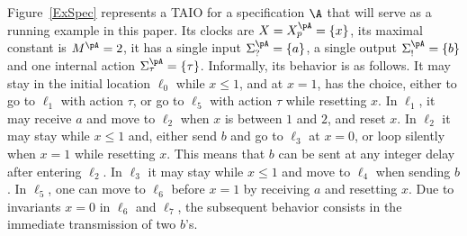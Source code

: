 \documentclass{LMCS}
\theoremstyle{plain}\newtheorem{proposition}[thm]{Proposition}
\begin{document}
\begin{exa}
Figure~\ref{ExSpec} represents a TAIO for a specification $\A$
that will serve as a running example in this paper.
Its clocks are $X=X_p^\pA=\{x\}$, its maximal constant is $M^\pA=2$, 
it has a single input $\Sigma_?^\pA=\{a\}$, 
a single output $\Sigma_!^\pA=\{b\}$ and 
one internal action $\Sigma_\tau^\pA=\{\tau\}$.
Informally, its behavior is as follows.
It may stay in the initial location $\ell_0$ while $x\leq 1$,
and at $x=1$, has the choice, either to go to $\ell_1$ with action $\tau$,
or go to $\ell_5$ with action $\tau$ while resetting $x$.
In $\ell_1$, it may receive $a$ and move to $\ell_2$ 
when $x$ is between $1$ and $2$, and reset $x$.
In $\ell_2$ it may stay while $x\leq 1$ and, 
either send $b$ and go to $\ell_3$ at $x=0$, 
or loop silently when $x=1$  while resetting $x$.
This means that $b$ can be sent at any integer delay after entering
$\ell_2$.
In $\ell_3$ it may stay while $x\leq 1$ and move to $\ell_4$ when sending $b$.
In $\ell_5$, one can move to $\ell_6$ before $x=1$ by receiving $a$ 
and resetting  $x$. Due to invariants $x=0$ in $\ell_6$ and 
$\ell_7$, the subsequent behavior consists in the immediate 
transmission of two $b$'s.
\end{exa}
\end{document}
